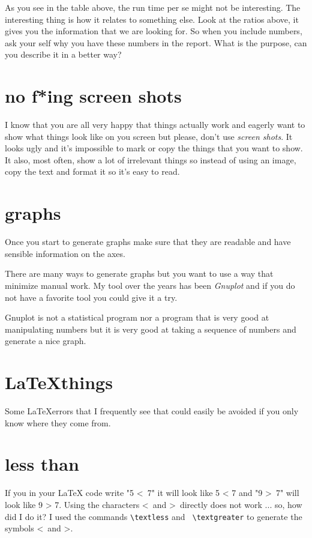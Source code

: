 \documentclass[a4paper,11pt]{article}
\begin{document}
As you see in the table above, the run time per se might not be
interesting. The interesting thing is how it relates to something
else. Look at the ratios above, it gives you the information that we
are looking for. So when you include numbers, ask your self why you
have these numbers in the report. What is the purpose, can you
describe it in a better way?


\section*{no f*ing screen shots}

I know that you are all very happy that things actually work and
eagerly want to show what things look like on you screen but please,
don't use {\em screen shots}. It looks ugly and it's impossible to mark or
copy the things that you want to show. It also, most often, show a lot
of irrelevant things so instead of using an image, copy the text and
format it so it's easy to read.

\section*{graphs}

Once you start to generate graphs make sure that they are readable and
have sensible information on the axes.

There are many ways to generate graphs but you want to
use a way that minimize manual work. My tool over the years has been
  {\em Gnuplot} and if you do not have a favorite tool you could give it
a try.

Gnuplot is not a statistical program nor a program that is very good at
manipulating numbers but it is very good at taking a sequence of
numbers and generate a nice graph.

\section*{\LaTeX things}

Some \LaTeX errors that I frequently see that could easily be avoided
if you only know where they come from.

\section*{less than}

If you in your LaTeX code write "5 \textless\ 7" it will look like 5 <
7 and "9 \textgreater\ 7" will look like 9 > 7. Using the characters
\textless\ and \textgreater\ directly does not work ... so, how did I
do it?  I used the commands {\tt  \textbackslash textless} and {\tt
    \textbackslash textgreater} to generate the symbols \textless\ and
\textgreater.
\end{document}
